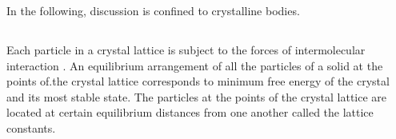 In the following, discussion is confined to crystalline bodies.

\subsection{}\label{40.1.2} Each particle in a crystal lattice is subject to the forces of intermolecular interaction . An equilibrium arrangement of all the particles of a solid at the points of.the crystal lattice
 corresponds to minimum free energy of the crystal  and its most stable state. The particles at the points of the crystal lattice are located at certain equilibrium distances from one another called the lattice constants.

